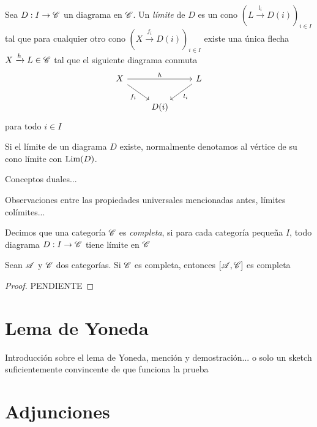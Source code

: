 \documentclass{comunicaciones}
\begin{document}
\begin{dfn}
    Sea $D:I\to\mathscr C$ un diagrama en $\mathscr C$. Un \emph{límite} de $D$ es un cono $(L\xrightarrow{l_i}D(i))_{i\in I}$ tal que para cualquier otro cono $(X\xrightarrow{f_i}D(i))_{i\in I}$
    existe una única flecha $X\xrightarrow{h}L\in\mathscr C$ tal que el siguiente diagrama conmuta
    \[\begin{tikzcd}
        X && L \\
        & {D(i)}
        \arrow["h", from=1-1, to=1-3]
        \arrow["{f_i}"', from=1-1, to=2-2]
        \arrow["{l_i}", from=1-3, to=2-2]
    \end{tikzcd}\] para todo $i\in I$
\end{dfn}

Si el límite de un diagrama $D$ existe, normalmente denotamos al vértice de su cono límite con $\mathrm{Lim}(D)$.

Conceptos duales...

Observaciones entre las propiedades universales mencionadas antes, límites colímites...

\begin{dfn}
    Decimos que una categoría $\mathscr C$ es \emph{completa}, si para cada categoría pequeña $I$, todo diagrama $D:I\to\mathscr C$ tiene límite en $\mathscr C$
\end{dfn}

\begin{thm}
    Sean $\mathscr A$ y $\mathscr C$ dos categorías. Si $\mathscr C$ es completa, entonces $[\mathscr A,\mathscr C]$ es completa
\end{thm}
\begin{proof}
    PENDIENTE
\end{proof}


\section{Lema de Yoneda}

Introducción sobre el lema de Yoneda, mención y demostración... o solo un sketch suficientemente convincente de que funciona la prueba

\section{Adjunciones}
\end{document}
